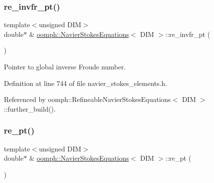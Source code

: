 \mbox{\label{classoomph_1_1NavierStokesEquations_a3be405ed2c9a6d798d6a0cae5ef6f2bb}} 
\subsubsection{\texorpdfstring{re\+\_\+invfr\+\_\+pt()}{re\_invfr\_pt()}}
{\footnotesize\ttfamily template$<$unsigned D\+IM$>$ \\
double$\ast$ \& \hyperlink{classoomph_1_1NavierStokesEquations}{oomph\+::\+Navier\+Stokes\+Equations}$<$ D\+IM $>$\+::re\+\_\+invfr\+\_\+pt (\begin{DoxyParamCaption}{ }\end{DoxyParamCaption})\hspace{0.3cm}{\ttfamily [inline]}}



Pointer to global inverse Froude number. 



Definition at line 744 of file navier\+\_\+stokes\+\_\+elements.\+h.



Referenced by oomph\+::\+Refineable\+Navier\+Stokes\+Equations$<$ D\+I\+M $>$\+::further\+\_\+build().

\mbox{\label{classoomph_1_1NavierStokesEquations_a36129d1ac06635d53ed3b0a10d56331f}} 
\subsubsection{\texorpdfstring{re\+\_\+pt()}{re\_pt()}}
{\footnotesize\ttfamily template$<$unsigned D\+IM$>$ \\
double$\ast$ \& \hyperlink{classoomph_1_1NavierStokesEquations}{oomph\+::\+Navier\+Stokes\+Equations}$<$ D\+IM $>$\+::re\+\_\+pt (\begin{DoxyParamCaption}{ }\end{DoxyParamCaption})\hspace{0.3cm}{\ttfamily [inline]}}



